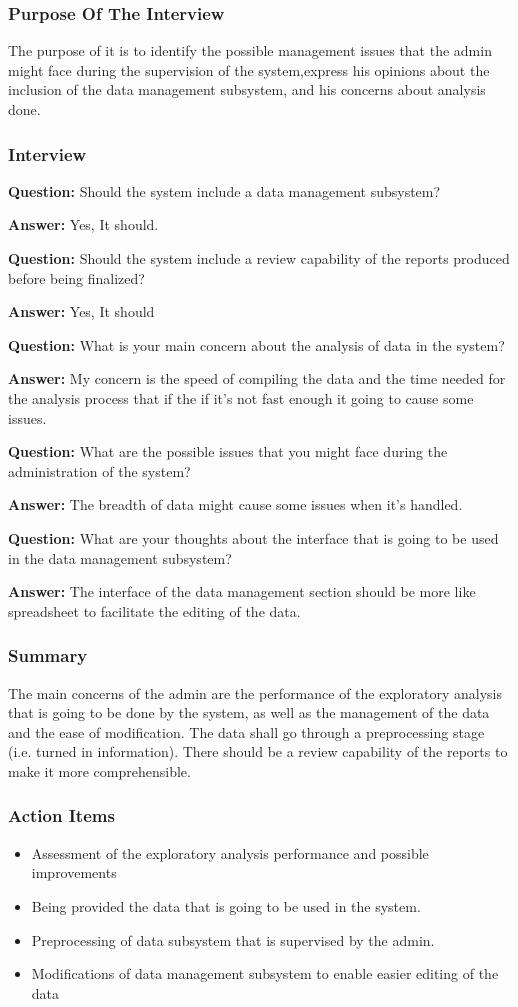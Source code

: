 \documentclass{article}
\begin{document}
\subsubsection{Purpose Of The Interview}
The purpose of it is to identify the possible management issues that the admin might face during the supervision of the system,express his opinions about the inclusion of the data management subsystem, and his concerns about analysis done.
\subsubsection{Interview}

\textbf{Question:} Should the system include a data management subsystem?

\textbf{Answer:} Yes, It should.

\textbf{Question:} Should the system include a review capability of the reports produced before being finalized?

\textbf{Answer:} Yes, It should

\textbf{Question:} What is your main concern about the analysis of data in the system?

\textbf{Answer:} My concern is the speed of compiling the data and the time needed for the analysis process that if the if it's not fast enough it going to cause some issues.

\textbf{Question:} What are the possible issues that you might face during the administration of the system?

\textbf{Answer:} The breadth of data might cause some issues when it's handled.

\textbf{Question:} What are your thoughts about the interface that is going to be used in the data management subsystem?

\textbf{Answer:} The interface of the data management section should be more like spreadsheet to facilitate the editing of the data.
\subsubsection{Summary}
The main concerns of the admin are the performance of the exploratory analysis that is going to be done by the system, as well as the management of the data and the ease of modification. The data shall go through a preprocessing stage (i.e. turned in information). There should be a review capability of the reports to make it more comprehensible.
\subsubsection{Action Items}
\begin{itemize}
    \item Assessment of the exploratory analysis performance and possible improvements
    \item Being provided the data that is going to be used in the system.
    \item Preprocessing of data subsystem that is supervised by the admin.
    \item Modifications of data management subsystem to enable easier editing of the data
\end{itemize}
\end{document}
